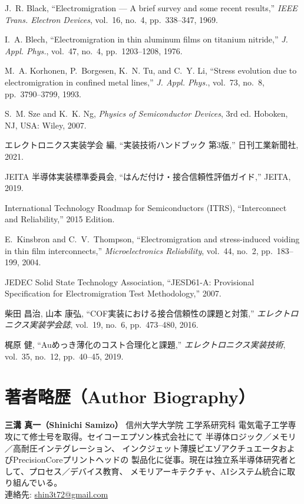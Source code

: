 \documentclass[conference]{IEEEtran}
\begin{document}
\balance

\begin{thebibliography}{99}

J.~R. Black, ``Electromigration --- A brief survey and some recent results,''
\emph{IEEE Trans. Electron Devices}, vol.~16, no.~4, pp.~338--347, 1969.

I.~A. Blech, ``Electromigration in thin aluminum films on titanium nitride,''
\emph{J. Appl. Phys.}, vol.~47, no.~4, pp.~1203--1208, 1976.

M.~A. Korhonen, P.~Borgesen, K.~N. Tu, and C.~Y. Li,
``Stress evolution due to electromigration in confined metal lines,''
\emph{J. Appl. Phys.}, vol.~73, no.~8, pp.~3790--3799, 1993.

S.~M. Sze and K.~K. Ng, \emph{Physics of Semiconductor Devices}, 3rd ed.
Hoboken, NJ, USA: Wiley, 2007.

エレクトロニクス実装学会 編, 
``実装技術ハンドブック 第3版,'' 日刊工業新聞社, 2021.

JEITA 半導体実装標準委員会, 
``はんだ付け・接合信頼性評価ガイド,'' JEITA, 2019.

International Technology Roadmap for Semiconductors (ITRS), 
``Interconnect and Reliability,'' 2015 Edition.

E.~Kinsbron and C.~V.~Thompson, 
``Electromigration and stress-induced voiding in thin film interconnects,''
\emph{Microelectronics Reliability}, vol.~44, no.~2, pp.~183--199, 2004.

JEDEC Solid State Technology Association, 
``JESD61-A: Provisional Specification for Electromigration Test Methodology,'' 2007.

柴田 昌治, 山本 康弘, 
``COF実装における接合信頼性の課題と対策,''
\emph{エレクトロニクス実装学会誌}, vol.~19, no.~6, pp.~473--480, 2016.

梶原 健, ``Auめっき薄化のコスト合理化と課題,'' 
\emph{エレクトロニクス実装技術}, vol.~35, no.~12, pp.~40--45, 2019.

\end{thebibliography}

\section*{著者略歴（Author Biography）}
\textbf{三溝 真一（Shinichi Samizo）} 信州大学大学院 工学系研究科
電気電子工学専攻にて修士号を取得。セイコーエプソン株式会社にて
半導体ロジック／メモリ／高耐圧インテグレーション、
インクジェット薄膜ピエゾアクチュエータおよびPrecisionCoreプリントヘッドの
製品化に従事。現在は独立系半導体研究者として、プロセス／デバイス教育、
メモリアーキテクチャ、AIシステム統合に取り組んでいる。\\
連絡先: \href{mailto:shin3t72@gmail.com}{shin3t72@gmail.com}
\end{document}
